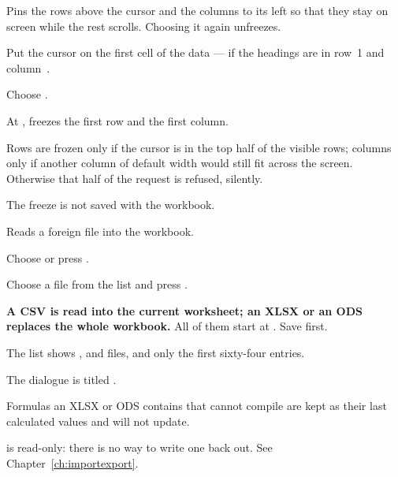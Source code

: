 Pins the rows above the cursor and the columns to its left so that they stay on
screen while the rest scrolls. Choosing it again unfreezes.

\begin{ccprocedure}[]
\item Put the cursor on the first cell of the data ---  if the
headings are in row~1 and column~.
\item Choose .
\end{ccprocedure}

\begin{ccsteps}
\item At , freezes the first row and the first column.
\item Rows are frozen only if the cursor is in the top half of the visible
rows; columns only if another column of default width would still fit across
the screen. Otherwise that half of the request is refused, silently.
\item The freeze is not saved with the workbook.
\end{ccsteps}


Reads a foreign file into the workbook.

\begin{ccprocedure}[]
\item Choose  or press .
\item Choose a file from the list and press .
\end{ccprocedure}

\begin{ccsteps}
\item \textbf{A CSV is read into the current worksheet; an XLSX or an ODS
replaces the whole workbook.} All of them start at . Save first.
\item The list shows ,  and  files, and
only the first sixty-four entries.
\item The dialogue is titled .
\item Formulas an XLSX or ODS contains that \ccprod{} cannot compile are kept
as their last calculated values and will not update.
\item {} is read-only: there is no way to write one back out. See
Chapter~\ref{ch:importexport}.
\end{ccsteps}

